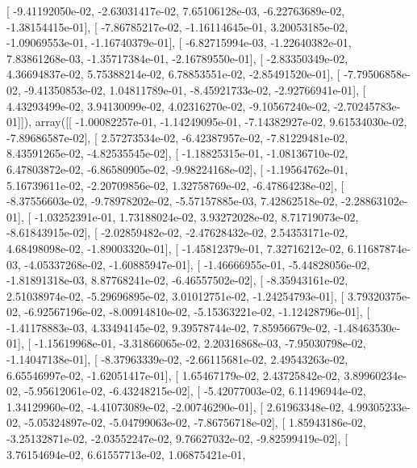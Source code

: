 \documentclass{article}
\begin{document}
       [ -9.41192050e-02,  -2.63031417e-02,   7.65106128e-03,
         -6.22763689e-02,  -1.38154415e-01],
       [ -7.86785217e-02,  -1.16114645e-01,   3.20053185e-02,
         -1.09069553e-01,  -1.16740379e-01],
       [ -6.82715994e-03,  -1.22640382e-01,   7.83861268e-03,
         -1.35717384e-01,  -2.16789550e-01],
       [ -2.83350349e-02,   4.36694837e-02,   5.75388214e-02,
          6.78853551e-02,  -2.85491520e-01],
       [ -7.79506858e-02,  -9.41350853e-02,   1.04811789e-01,
         -8.45921733e-02,  -2.92766941e-01],
       [  4.43293499e-02,   3.94130099e-02,   4.02316270e-02,
         -9.10567240e-02,  -2.70245783e-01]]), array([[ -1.00082257e-01,  -1.14249095e-01,  -7.14382927e-02,
          9.61534030e-02,  -7.89686587e-02],
       [  2.57273534e-02,  -6.42387957e-02,  -7.81229481e-02,
          8.43591265e-02,  -4.82535545e-02],
       [ -1.18825315e-01,  -1.08136710e-02,   6.47803872e-02,
         -6.86580905e-02,  -9.98224168e-02],
       [ -1.19564762e-01,   5.16739611e-02,  -2.20709856e-02,
          1.32758769e-02,  -6.47864238e-02],
       [ -8.37556603e-02,  -9.78978202e-02,  -5.57157885e-03,
          7.42862518e-02,  -2.28863102e-01],
       [ -1.03252391e-01,   1.73188024e-02,   3.93272028e-02,
          8.71719073e-02,  -8.61843915e-02],
       [ -2.02859482e-02,  -2.47628432e-02,   2.54353171e-02,
          4.68498098e-02,  -1.89003320e-01],
       [ -1.45812379e-01,   7.32716212e-02,   6.11687874e-03,
         -4.05337268e-02,  -1.60885947e-01],
       [ -1.46666955e-01,  -5.44828056e-02,  -1.81891318e-03,
          8.87768241e-02,  -6.46557502e-02],
       [ -8.35943161e-02,   2.51038974e-02,  -5.29696895e-02,
          3.01012751e-02,  -1.24254793e-01],
       [  3.79320375e-02,  -6.92567196e-02,  -8.00914810e-02,
         -5.15363221e-02,  -1.12428796e-01],
       [ -1.41178883e-03,   4.33494145e-02,   9.39578744e-02,
          7.85956679e-02,  -1.48463530e-01],
       [ -1.15619968e-01,  -3.31866065e-02,   2.20316868e-03,
         -7.95030798e-02,  -1.14047138e-01],
       [ -8.37963339e-02,  -2.66115681e-02,   2.49543263e-02,
          6.65546997e-02,  -1.62051417e-01],
       [  1.65467179e-02,   2.43725842e-02,   3.89960234e-02,
         -5.95612061e-02,  -6.43248215e-02],
       [ -5.42077003e-02,   6.11496944e-02,   1.34129960e-02,
         -4.41073089e-02,  -2.00746290e-01],
       [  2.61963348e-02,   4.99305233e-02,  -5.05324897e-02,
         -5.04799063e-02,  -7.86756718e-02],
       [  1.85943186e-02,  -3.25132871e-02,  -2.03552247e-02,
          9.76627032e-02,  -9.82599419e-02],
       [  3.76154694e-02,   6.61557713e-02,   1.06875421e-01,
\end{document}
